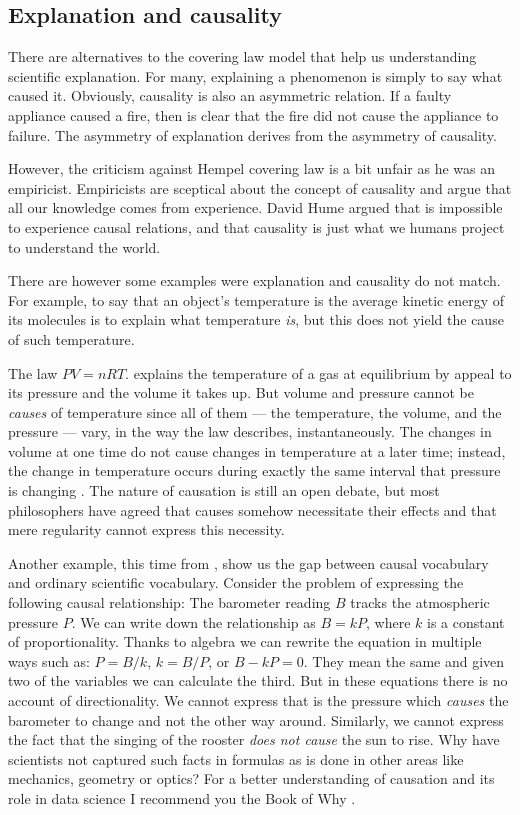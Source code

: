 \documentclass[
]{book}
\begin{document}
\hypertarget{explanation-and-causality}{%
\subsection{Explanation and causality}\label{explanation-and-causality}}

There are alternatives to the covering law model that help us understanding scientific explanation. For many, explaining a phenomenon is simply to say what caused it. Obviously, causality is also an asymmetric relation. If a faulty appliance caused a fire, then is clear that the fire did not cause the appliance to failure. The asymmetry of explanation derives from the asymmetry of causality.

However, the criticism against Hempel covering law is a bit unfair as he was an empiricist. Empiricists are sceptical about the concept of causality and argue that all our knowledge comes from experience. David Hume argued that is impossible to experience causal relations, and that causality is just what we humans project to understand the world.

There are however some examples were explanation and causality do not match. For example, to say that an object's temperature is the average kinetic energy of its molecules is to explain what temperature \emph{is}, but this does not yield the cause of such temperature.

The law \(PV = nRT.\) explains the temperature of a gas at equilibrium by appeal to its pressure and the volume it takes up. But volume and pressure cannot be \emph{causes} of temperature since all of them --- the temperature, the volume, and the pressure --- vary, in the way the law describes, instantaneously. The changes in volume at one time do not cause changes in temperature at a later time; instead, the change in temperature occurs during exactly the same interval that pressure is changing \citep{rosenberg2019philosophy}. The nature of causation is still an open debate, but most philosophers have agreed that causes somehow necessitate their effects and that mere regularity cannot express this necessity.

Another example, this time from \citep{book-of-why}, show us the gap between causal vocabulary and ordinary scientific vocabulary. Consider the problem of expressing the following causal relationship: The barometer reading \(B\) tracks the atmospheric pressure \(P\). We can write down the relationship as \(B = kP\), where \(k\) is a constant of proportionality. Thanks to algebra we can rewrite the equation in multiple ways such as: \(P = B/k\), \(k = B/P\), or \(B-kP = 0\). They mean the same and given two of the variables we can calculate the third. But in these equations there is no account of directionality. We cannot express that is the pressure which \emph{causes} the barometer to change and not the other way around. Similarly, we cannot express the fact that the singing of the rooster \emph{does not cause} the sun to rise. Why have scientists not captured such facts in formulas as is done in other areas like mechanics, geometry or optics? For a better understanding of causation and its role in data science I recommend you the Book of Why \citep{book-of-why}.
\end{document}
